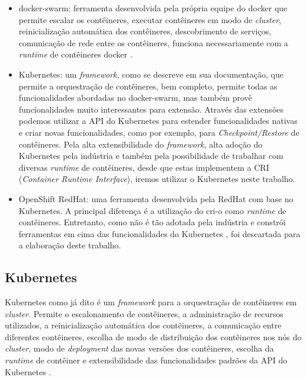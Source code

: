 \begin{itemize}
    \item docker-swarm: ferramenta desenvolvida pela própria equipe do docker que
    permite escalar os contêineres, executar contêineres em modo de \textit{cluster},
    reinicialização automática dos contêineres, descobrimento de serviços,
    comunicação de rede entre os contêineres, funciona necessariamente com a
    \textit{runtime} de contêineres docker \cite{docker-swarm}.
    \item Kubernetes: um \textit{framework}, como se descreve em sua documentação,
    que permite a orquestração de contêineres, bem completo, permite todas as
    funcionalidades abordadas no docker-swarm, mas também provê funcionalidades
    muito interessantes para extensão. Através das extensões podemos utilizar a API do
    Kubernetes para estender funcionalidades nativas e criar novas funcionalidades, como por exemplo,
    para \textit{Checkpoint/Restore} de contêineres. Pela alta extensibilidade do
    \textit{framework}, alta adoção do Kubernetes pela indústria
    \cite{kubernetes:usage} e também pela possibilidade de trabalhar com diversas
    \textit{runtime} de contêineres, desde que estas implementem a CRI
    (\textit{Container Runtime Interface}), iremos utilizar o Kubernetes neste trabalho. 
    \item OpenShift RedHat: uma ferramenta desenvolvida pela RedHat com base no
    Kubernetes. A principal diferença é a utilização do cri-o como \textit{runtime}
    de contêineres. Entretanto, como não é tão adotada pela indústria e constrói
    ferramentas em cima das funcionalidades do Kubernetes \cite{openshift}, foi
    descartada para a elaboração deste trabalho.
\end{itemize}

\subsection{Kubernetes}

Kubernetes como já dito é um \textit{framework} para a orquestração de
contêineres em \textit{cluster}. Permite o escalonamento de contêineres,
a administração de recursos utilizados, a reinicialização automática dos
contêineres, a comunicação entre diferentes contêineres, escolha de modo
de distribuição dos contêineres nos nós do \textit{cluster}, modo de
\textit{deployment} das novas versões dos contêineres, escolha da
\textit{runtime} de contêiner e extensibilidade das funcionalidades
padrões da API do Kubernetes \cite{kubernetes}.

